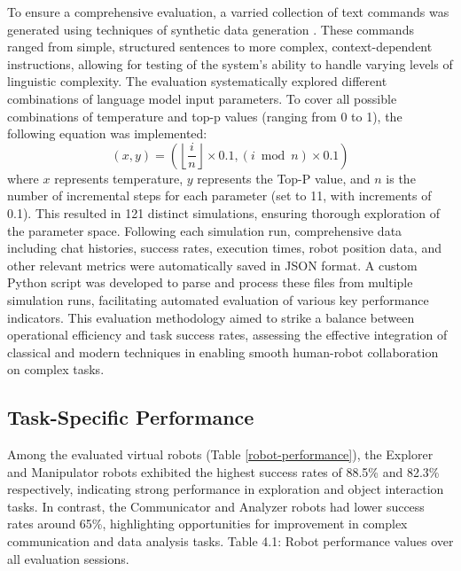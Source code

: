 \documentclass[pdflatex,sn-mathphys-num]{sn-jnl}
\theoremstyle{thmstyleone}
\theoremstyle{thmstyletwo}%
\theoremstyle{thmstylethree}%
\begin{document}
To ensure a comprehensive evaluation, a varried collection of text commands was generated using techniques of synthetic data generation \cite{inproceedings}. These commands ranged from simple, structured sentences to more complex, context-dependent instructions, allowing for testing of the system's ability to handle varying levels of linguistic complexity.
The evaluation systematically explored different combinations of language model input parameters. To cover all possible combinations of temperature and top-p values (ranging from 0 to 1), the following equation was implemented:
\begin{equation}
(x, y) = \left(\left\lfloor\frac{i}{n}\right\rfloor \times 0.1, (i \bmod n) \times 0.1\right)
\end{equation}
where $x$ represents temperature, $y$ represents the Top-P value, and $n$ is the number of incremental steps for each parameter (set to 11, with increments of 0.1). This resulted in 121 distinct simulations, ensuring thorough exploration of the parameter space.
Following each simulation run, comprehensive data including chat histories, success rates, execution times, robot position data, and other relevant metrics were automatically saved in JSON format. A custom Python script was developed to parse and process these files from multiple simulation runs, facilitating automated evaluation of various key performance indicators.
This evaluation methodology aimed to strike a balance between operational efficiency and task success rates, assessing the effective integration of classical and modern techniques in enabling smooth human-robot collaboration on complex tasks.


\subsection{Task-Specific Performance}
Among the evaluated virtual robots (Table \ref{robot-performance}), the Explorer and Manipulator robots exhibited the highest success rates of 88.5\% and 82.3\% respectively, indicating strong performance in exploration and object interaction tasks. In contrast, the Communicator and Analyzer robots had lower success rates around 65\%, highlighting opportunities for improvement in complex communication and data analysis tasks.
Table 4.1: Robot performance values over all evaluation sessions.
\end{document}
